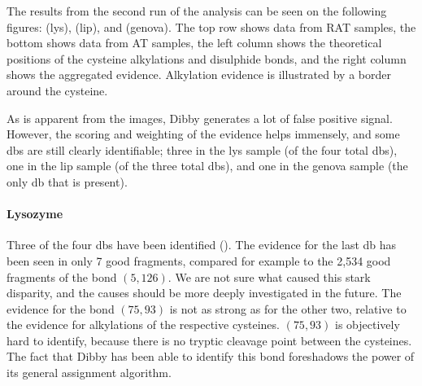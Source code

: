 The results from the second run of the analysis can be seen on the following figures:  (\gls*{lys}),  (\gls*{lip}), and  (\gls*{genova}). The top row shows data from RAT samples, the bottom shows data from AT samples, the left column shows the theoretical positions of the cysteine alkylations and disulphide bonds, and the right column shows the aggregated evidence. Alkylation evidence is illustrated by a border around the cysteine.

As is apparent from the images, Dibby generates a lot of false positive signal. However, the scoring and weighting of the evidence helps immensely, and some \glspl*{db} are still clearly identifiable; three in the \gls*{lys} sample (of the four total \glspl*{db}), one in the \gls*{lip} sample (of the three total \glspl*{db}), and one in the \gls*{genova} sample (the only \gls*{db} that is present).


\paragraph{Lysozyme} Three of the four \glspl*{db} have been identified (). The evidence for the last \gls*{db} has been seen in only 7 good fragments, compared for example to the 2,534 good fragments of the bond \((5, 126)\). We are not sure what caused this stark disparity, and the causes should be more deeply investigated in the future. The evidence for the bond \((75, 93)\) is not as strong as for the other two, relative to the evidence for alkylations of the respective cysteines. \((75, 93)\) is objectively hard to identify, because there is no tryptic cleavage point between the cysteines. The fact that Dibby has been able to identify this bond foreshadows the power of its general assignment algorithm.

